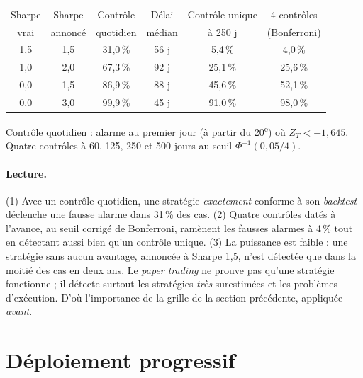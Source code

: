 \begin{codebox}
\begin{center}\small
\setlength{\tabcolsep}{4pt}
\begin{tabular}{cccccc}
\toprule
Sharpe & Sharpe & Contrôle & Délai & Contrôle unique & 4 contrôles \\
vrai & annoncé & quotidien & médian & à 250 j & (Bonferroni) \\
\midrule
1,5 & 1,5 & 31,0\,\% & 56 j & 5,4\,\% & 4,0\,\% \\
1,0 & 2,0 & 67,3\,\% & 92 j & 25,1\,\% & 25,6\,\% \\
0,0 & 1,5 & 86,9\,\% & 88 j & 45,6\,\% & 52,1\,\% \\
0,0 & 3,0 & 99,9\,\% & 45 j & 91,0\,\% & 98,0\,\% \\
\bottomrule
\end{tabular}
\end{center}
Contrôle quotidien : alarme au premier jour (à partir du 20\textsuperscript{e}) où $Z_T < -1{,}645$. Quatre contrôles à 60, 125, 250 et 500 jours au seuil $\Phi^{-1}(0{,}05/4)$.
\end{codebox}

\paragraph{Lecture.} (1) Avec un contrôle quotidien, une stratégie \emph{exactement} conforme à son \emph{backtest} déclenche une fausse alarme dans 31\,\% des cas. (2) Quatre contrôles datés à l'avance, au seuil corrigé de Bonferroni, ramènent les fausses alarmes à 4\,\% tout en détectant aussi bien qu'un contrôle unique. (3) La puissance est faible : une stratégie sans aucun avantage, annoncée à Sharpe 1,5, n'est détectée que dans la moitié des cas en deux ans. Le \emph{paper trading} ne prouve pas qu'une stratégie fonctionne ; il détecte surtout les stratégies \emph{très} surestimées et les problèmes d'exécution. D'où l'importance de la grille de la section précédente, appliquée \emph{avant}.

\section{Déploiement progressif}


